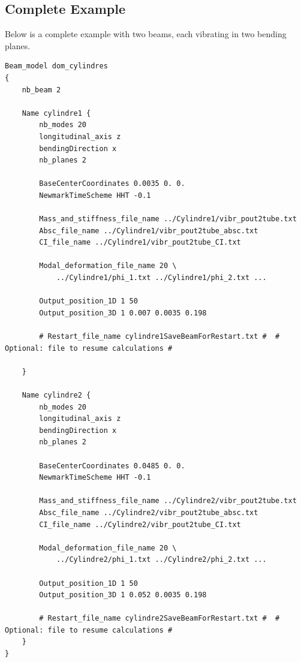 \subsection*{Complete Example}

Below is a complete example with two beams, each vibrating in two bending planes.


\begin{lstlisting}
Beam_model dom_cylindres
{
    nb_beam 2

    Name cylindre1 {
        nb_modes 20
        longitudinal_axis z       
        bendingDirection x      
        nb_planes 2

        BaseCenterCoordinates 0.0035 0. 0.
        NewmarkTimeScheme HHT -0.1

        Mass_and_stiffness_file_name ../Cylindre1/vibr_pout2tube.txt
        Absc_file_name ../Cylindre1/vibr_pout2tube_absc.txt
        CI_file_name ../Cylindre1/vibr_pout2tube_CI.txt

        Modal_deformation_file_name 20 \
            ../Cylindre1/phi_1.txt ../Cylindre1/phi_2.txt ...

        Output_position_1D 1 50
        Output_position_3D 1 0.007 0.0035 0.198
        
        # Restart_file_name cylindre1SaveBeamForRestart.txt #  # Optional: file to resume calculations #

    }

    Name cylindre2 {
        nb_modes 20
        longitudinal_axis z
        bendingDirection x
        nb_planes 2

        BaseCenterCoordinates 0.0485 0. 0.
        NewmarkTimeScheme HHT -0.1

        Mass_and_stiffness_file_name ../Cylindre2/vibr_pout2tube.txt
        Absc_file_name ../Cylindre2/vibr_pout2tube_absc.txt
        CI_file_name ../Cylindre2/vibr_pout2tube_CI.txt

        Modal_deformation_file_name 20 \
            ../Cylindre2/phi_1.txt ../Cylindre2/phi_2.txt ...

        Output_position_1D 1 50
        Output_position_3D 1 0.052 0.0035 0.198
        
        # Restart_file_name cylindre2SaveBeamForRestart.txt #  # Optional: file to resume calculations #
    }
}
\end{lstlisting}


